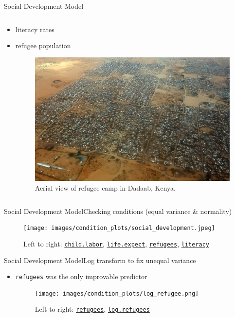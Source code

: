 \documentclass{beamer}
\begin{document}
\begin{frame}{{\sc Social Development} Model}
\begin{columns}
    \begin{column}{0.5\textwidth}
      \begin{itemize}
      \item literacy rates
      \item refugee population
        \begin{figure}
	  \centering
	  \includegraphics[scale=0.2]{images/refugee_camp.jpg}
	  \caption{Aerial view of refugee camp in Dadaab, Kenya.}
        \end{figure}
      \end{itemize}
    \end{column}
  \end{columns}
\end{frame}


\begin{frame}{{\sc Social Development} Model}{Checking conditions (equal variance \& normality)}
    \begin{figure}
      \centering
      \texttt{[image: images/condition\_plots/social\_development.jpeg]}
      \caption{Left to right: \href{http://data.worldbank.org/indicator/SL.TLF.0714.ZS}{\tt child.labor}, \href{http://data.worldbank.org/indicator/SP.DYN.LE00.IN}{\tt life.expect}, \href{http://data.worldbank.org/indicator/SM.POP.REFG.OR}{\tt refugees}, \href{http://data.worldbank.org/indicator/SE.ADT.LITR.ZS}{\tt literacy}}
    \end{figure}
\end{frame}

\begin{frame}{{\sc Social Development} Model}{Log transform to fix unequal variance}
  \begin{itemize}
  \item {\tt refugees} was the only improvable predictor
    \begin{figure}
      \centering
      \texttt{[image: images/condition\_plots/log\_refugee.png]}
      \caption{Left to right: \href{http://data.worldbank.org/indicator/SM.POP.REFG.OR}{\tt refugees}, \href{http://data.worldbank.org/indicator/SM.POP.REFG.OR}{\tt log.refugees}}
    \end{figure}
  \end{itemize}
\end{frame}
\end{document}
